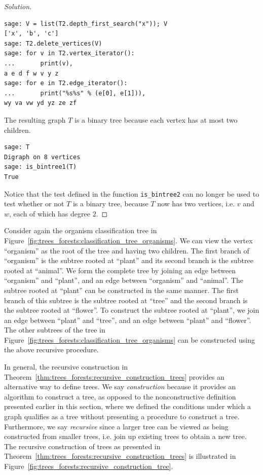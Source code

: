 \begin{proof}[Solution]
\begin{lstlisting}
sage: V = list(T2.depth_first_search("x")); V
['x', 'b', 'c']
sage: T2.delete_vertices(V)
sage: for v in T2.vertex_iterator():
...       print(v),
a e d f w v y z
sage: for e in T2.edge_iterator():
...       print("%s%s" % (e[0], e[1])),
wy va vw yd yz ze zf
\end{lstlisting}
The resulting graph $T$ is a binary tree because
each vertex has at most two children.
\begin{lstlisting}
sage: T
Digraph on 8 vertices
sage: is_bintree1(T)
True
\end{lstlisting}
Notice that the test defined in the function \verb!is_bintree2! can no
longer be used to test whether or not $T$ is a binary tree, because
$T$ now has two vertices, i.e. $v$ and $w$, each of which has degree $2$.
\end{proof}

Consider again the organism
classification tree in
Figure~\ref{fig:trees_forests:classification_tree_organisms}. We can
view the vertex ``organism'' as the root of the tree and having two
children. The first branch of ``organism'' is the
subtree rooted at ``plant'' and its second branch is
the subtree rooted at ``animal''. We form the
complete tree by joining an edge between
``organism'' and ``plant'', and an edge between ``organism'' and
``animal''. The subtree rooted at ``plant'' can be constructed in the
same manner. The first branch of this subtree is the subtree rooted at
``tree'' and the second branch is the subtree rooted at ``flower''. To
construct the subtree rooted at ``plant'', we join an edge between
``plant'' and ``tree'', and an edge between ``plant'' and
``flower''. The other subtrees of the tree in
Figure~\ref{fig:trees_forests:classification_tree_organisms} can be
constructed using the above recursive procedure.

In general, the recursive construction in
Theorem~\ref{thm:trees_forests:recursive_construction_trees} provides
an alternative way to define
trees. We say \emph{construction} because it provides an algorithm to
construct a tree, as opposed to the nonconstructive definition
presented earlier in this section, where we defined the conditions
under which a graph qualifies as a tree without presenting a procedure
to construct a tree. Furthermore, we say
\emph{recursive} since a larger tree can be viewed as
being constructed from smaller trees, i.e. join up existing trees to
obtain a new tree. The recursive construction of
trees as presented in
Theorem~\ref{thm:trees_forests:recursive_construction_trees} is
illustrated in
Figure~\ref{fig:trees_forests:recursive_construction_tree}.

